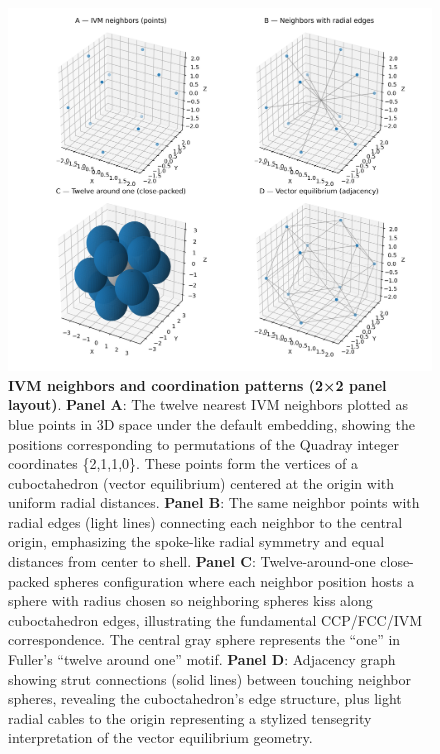 \documentclass[
  10pt,
]{article}
\begin{document}
\begin{figure}
\centering
\includegraphics{../output/figures/ivm_neighbors_edges.png}
\caption{\textbf{IVM neighbors and coordination patterns (2×2 panel
layout)}. \textbf{Panel A}: The twelve nearest IVM neighbors plotted as
blue points in 3D space under the default embedding, showing the
positions corresponding to permutations of the Quadray integer
coordinates \{2,1,1,0\}. These points form the vertices of a
cuboctahedron (vector equilibrium) centered at the origin with uniform
radial distances. \textbf{Panel B}: The same neighbor points with radial
edges (light lines) connecting each neighbor to the central origin,
emphasizing the spoke-like radial symmetry and equal distances from
center to shell. \textbf{Panel C}: Twelve-around-one close-packed
spheres configuration where each neighbor position hosts a sphere with
radius chosen so neighboring spheres kiss along cuboctahedron edges,
illustrating the fundamental CCP/FCC/IVM correspondence. The central
gray sphere represents the ``one'' in Fuller's ``twelve around one''
motif. \textbf{Panel D}: Adjacency graph showing strut connections
(solid lines) between touching neighbor spheres, revealing the
cuboctahedron's edge structure, plus light radial cables to the origin
representing a stylized tensegrity interpretation of the vector
equilibrium geometry.}
\end{figure}
\end{document}
